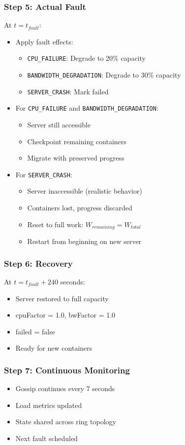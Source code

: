 \documentclass[12pt,a4paper]{article}
\begin{document}
\subsubsection{Step 5: Actual Fault}
At $t = t_{fault}$:
\begin{itemize}
    \item Apply fault effects:
    \begin{itemize}
        \item \texttt{CPU\_FAILURE}: Degrade to 20\% capacity
        \item \texttt{BANDWIDTH\_DEGRADATION}: Degrade to 30\% capacity
        \item \texttt{SERVER\_CRASH}: Mark failed
    \end{itemize}
    \item For \texttt{CPU\_FAILURE} and \texttt{BANDWIDTH\_DEGRADATION}:
    \begin{itemize}
        \item Server still accessible
        \item Checkpoint remaining containers
        \item Migrate with preserved progress
    \end{itemize}
    \item For \texttt{SERVER\_CRASH}:
    \begin{itemize}
        \item Server inaccessible (realistic behavior)
        \item Containers lost, progress discarded
        \item Reset to full work: $W_{remaining} = W_{total}$
        \item Restart from beginning on new server
    \end{itemize}
\end{itemize}

\subsubsection{Step 6: Recovery}
At $t = t_{fault} + 240$ seconds:
\begin{itemize}
    \item Server restored to full capacity
    \item cpuFactor = 1.0, bwFactor = 1.0
    \item failed = false
    \item Ready for new containers
\end{itemize}

\subsubsection{Step 7: Continuous Monitoring}
\begin{itemize}
    \item Gossip continues every 7 seconds
    \item Load metrics updated
    \item State shared across ring topology
    \item Next fault scheduled
\end{itemize}
\end{document}
